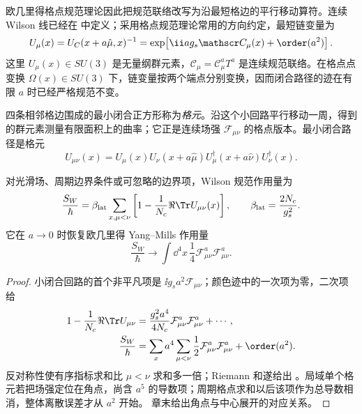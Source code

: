 \begin{definition}[链变量与格元]
欧几里得格点规范理论因此把规范联络改写为沿最短格边的平行移动算符。连续 Wilson 线已经在 中定义；采用格点规范理论常用的方向约定，最短链变量为
\begin{equation}
 {
 U_\mu(x)
 =U_C(x+a\hat\mu,x)^{-1}
 =\exp\!\left[\ii a g_s\mathscr C_\mu(x)+\order(a^2)\right].}
 \label{eq:lattice-link-dp11}
\end{equation}
这里 $U_\mu(x)\in SU(3)$ 是无量纲群元素，$\mathscr C_\mu=\mathscr C_\mu^aT^a$ 是连续规范联络。在格点点变换 $\Omega(x)\in SU(3)$ 下，链变量按两个端点分别变换，因而闭合路径的迹在有限 $a$ 时已经严格规范不变。

四条相邻格边围成的最小闭合正方形称为\emph{格元}。沿这个小回路平行移动一周，得到的群元素测量有限面积上的曲率；它正是连续场强 $\mathcal F_{\mu\nu}$ 的格点版本。最小闭合路径是格元
\begin{equation}
 U_{\mu\nu}(x)
 =U_\mu(x)U_\nu(x+a\hat\mu)
 U_\mu^\dagger(x+a\hat\nu)U_\nu^\dagger(x).
 \label{eq:plaquette-definition-dp11}
\end{equation}
\end{definition}

\begin{proposition}
对光滑场、周期边界条件或可忽略的边界项，Wilson 规范作用量为
\begin{equation}
 {
 \frac{S_W}{\hbar}
 =\beta_{\rm lat}\sum_{x,\mu<\nu}
 \left[1-\frac1{N_c}\Re\Tr U_{\mu\nu}(x)\right],
 \qquad
 \beta_{\rm lat}=\frac{2N_c}{g_s^2}.}
 \label{eq:wilson-gauge-action-dp11}
\end{equation}
它在 $a\to0$ 时恢复欧几里得 Yang--Mills 作用量
\begin{equation}
 {
 \frac{S_W}{\hbar}
 \longrightarrow
 \int\dd^4 x\,\frac14\mathcal F_{\mu\nu}^a\mathcal F_{\mu\nu}^a.}
 \label{eq:wilson-continuum-limit-dp11}
\end{equation}
\end{proposition}

\begin{proof}
小闭合回路的首个非平凡项是 $\ii g_sa^2\mathcal F_{\mu\nu}$；颜色迹中的一次项为零，二次项给
\begin{align*}
1-\frac1{N_c}\Re\Tr U_{\mu\nu}
&=\frac{g_s^2a^4}{4N_c}\mathcal F_{\mu\nu}^a\mathcal F_{\mu\nu}^a+\cdots,\\
\frac{S_W}{\hbar}
&=\sum_xa^4\sum_{\mu<\nu}\frac12\mathcal F_{\mu\nu}^a\mathcal F_{\mu\nu}^a+\order(a^2).
\end{align*}
反对称性使有序指标求和比 $\mu<\nu$ 求和多一倍；Riemann 和遂给出
。局域单个格元若把场强定位在角点，尚含
$a^5$ 的导数项；周期格点求和以后该项作为总导数相消，整体离散误差才从 $a^2$ 开始。
章末给出角点与中心展开的对应关系。
\end{proof}

